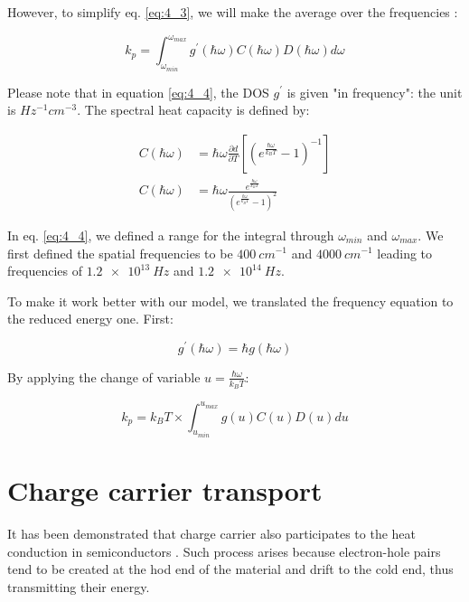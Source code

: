However, to simplify eq. \ref{eq:4_3}, we will make the average over the frequencies \cite{thermal_the_one}:

\begin{equation}
    k_p = \int_{\omega_{min}}^{\omega_{max}} g^\prime (\hbar\omega) C(\hbar\omega)D(\hbar\omega) d \omega
    \label{eq:4_4}
\end{equation}

Please note that in equation \ref{eq:4_4}, the DOS $g^\prime$ is given "in frequency": the unit is $\si{Hz^{-1} cm^{-3}}$. The spectral heat capacity is defined by:

\begin{equation}
    \begin{aligned}
        C(\hbar\omega) &= \hbar \omega \frac{\partial d}{\partial T} \left[\left(e^{\frac{\hbar \omega}{k_BT}} - 1\right)^{-1}\right] \\
        C(\hbar\omega) &= \hbar\omega \frac{e^{\frac{\hbar\omega}{k_BT}}}{\left(e^{\frac{\hbar\omega}{k_BT}} - 1\right)^2}
    \end{aligned}
    \label{eq:4_5}
\end{equation}

In eq. \ref{eq:4_4}, we defined a range for the integral through $\omega_{min}$ and $\omega_{max}$. We first defined the spatial frequencies to be $\SI{400}{cm^{-1}}$ and $\SI{4000}{cm^{-1}}$ leading to frequencies of $\SI{1.2e13}{Hz}$ and $\SI{1.2e14}{Hz}$.

To make it work better with our model, we translated the frequency equation to the reduced energy one. First:

\begin{equation}
    g^\prime(\hbar \omega) = \hbar g(\hbar\omega)
    \label{eq:4_6}
\end{equation}

By applying the change of variable $u = \frac{\hbar\omega}{k_BT}$:

\begin{equation}
    k_p = k_BT \times\int_{u_{min}}^{u_{max}} g (u) C(u)D(u)d u
    \label{eq:4_7}
\end{equation}

\section{Charge carrier transport}

It has been demonstrated that charge carrier also participates to the heat conduction in semiconductors \cite{thermal_transport}. Such process arises because electron-hole pairs tend to be created at the hod end of the material and drift to the cold end, thus transmitting their energy.

